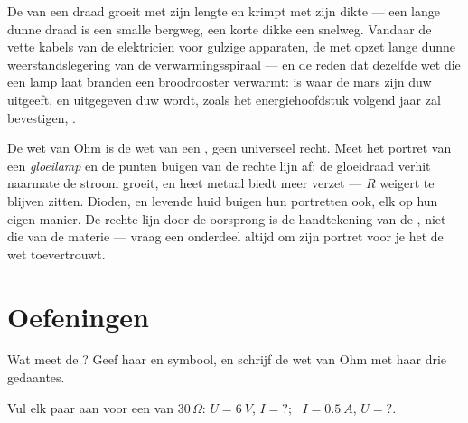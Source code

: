 \begin{example}\label{ex:g8:ohms-law:wires}
De  van een draad groeit met zijn lengte en krimpt
met zijn dikte --- een lange dunne draad is een smalle bergweg, een
korte dikke een snelweg. Vandaar de vette kabels van de elektricien
voor gulzige apparaten, de met opzet lange dunne weerstandslegering van
de verwarmingsspiraal --- en de reden dat dezelfde wet die een lamp
laat branden een broodrooster verwarmt:
 is waar de mars zijn duw uitgeeft, en uitgegeven duw
wordt, zoals het energiehoofdstuk volgend jaar zal bevestigen,
.
\end{example}

\begin{remark}\label{rem:g8:ohms-law:limits}
De wet van Ohm is de wet van een , geen universeel
recht. Meet het portret van een \emph{gloeilamp} en de punten buigen
van de rechte lijn af: de gloeidraad verhit naarmate de stroom
groeit, en heet metaal biedt meer verzet --- $R$ weigert te blijven
zitten. Dioden,  en levende huid buigen hun portretten
ook, elk op hun eigen manier. De rechte lijn door de oorsprong is de
handtekening van de , niet die van de materie ---
vraag een onderdeel altijd om zijn portret voor je het de wet
toevertrouwt.
\end{remark}

\section{Oefeningen}

\begin{exercise}[$\star$]\label{exo:g8:ohms-law:1}
Wat meet de ? Geef haar
 en symbool, en schrijf de wet van Ohm met haar drie
gedaantes.
\end{exercise}

\begin{exercise}[$\star$]\label{exo:g8:ohms-law:2}
Vul elk paar aan voor een  van $30\,\Omega$: $U =
\qty{6}{V}$, $I = {?}$; \ $I = \qty{0.5}{A}$, $U = {?}$.
\end{exercise}

